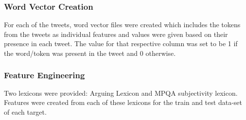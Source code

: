 \documentclass[9pt,twocolumn,twoside]{styles/osajnl}
\begin{document}
\subsubsection{Word Vector Creation}
For each of the tweets, word vector files were created which includes the tokens from the tweets as individual features and values were given based on their presence in each tweet. The value for that respective column was set to be 1 if the word/token was present in the tweet and 0 otherwise.
\subsubsection{Feature Engineering }
Two lexicons were provided: Arguing Lexicon and MPQA subjectivity lexicon. Features were created from each of these lexicons for the train and test data-set of each target. 
\end{document}
